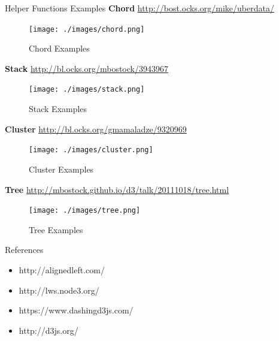 \documentclass{beamer}
\begin{document}
\begin{frame} {Helper Functions Examples}
\textbf{Chord} \url{http://bost.ocks.org/mike/uberdata/}
\begin{figure}
\texttt{[image: ./images/chord.png]}
\caption{\label{fig:chord} Chord Examples}
\end{figure}
\end{frame}

\begin{frame}
\textbf{Stack} \url{http://bl.ocks.org/mbostock/3943967}
\begin{figure}
\texttt{[image: ./images/stack.png]}
\caption{\label{fig:stack} Stack Examples}
\end{figure}
\end{frame}

\begin{frame}
\textbf{Cluster} \url{http://bl.ocks.org/gmamaladze/9320969}
\begin{figure}
\texttt{[image: ./images/cluster.png]}
\caption{\label{fig:cluster} Cluster Examples}
\end{figure}
\end{frame}

\begin{frame}
\textbf{Tree} \url{http://mbostock.github.io/d3/talk/20111018/tree.html}
\begin{figure}
\texttt{[image: ./images/tree.png]}
\caption{\label{fig:tree} Tree Examples}
\end{figure}
\end{frame}

\begin{frame}{References}
\begin{itemize}
	\item http://alignedleft.com/ 
	\item http://lws.node3.org/
	\item https://www.dashingd3js.com/
	\item http://d3js.org/
\end{itemize}
\end{frame}
\end{document}
